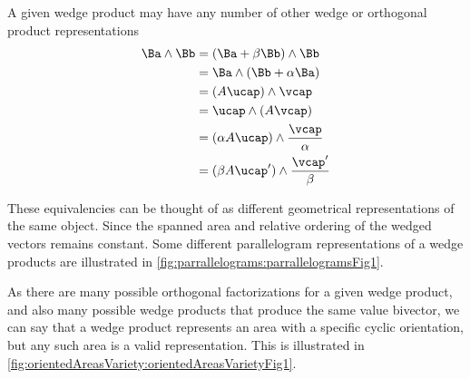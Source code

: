 A given wedge product may have any number of other wedge or orthogonal product representations
\begin{equation}\label{eqn:wedgeProductArea:1940}
\begin{aligned}
\Ba \wedge \Bb
&= (\Ba + \beta \Bb ) \wedge \Bb \\
&= \Ba \wedge ( \Bb + \alpha \Ba ) \\
&= (A \ucap) \wedge \vcap \\
&= \ucap \wedge (A \vcap) \\
&= (\alpha A \ucap) \wedge \frac{\vcap}{\alpha} \\
&= (\beta A \ucap') \wedge \frac{\vcap'}{\beta} \\
\end{aligned}
\end{equation}

These equivalencies can be thought of as different geometrical representations of the same object. Since the spanned area and relative ordering of the wedged vectors remains constant.
Some different parallelogram representations of a wedge products are illustrated in \cref{fig:parrallelograms:parrallelogramsFig1}.


As there are many possible orthogonal factorizations for a given wedge product, and also many possible wedge products that produce the same value bivector,
we can say that a wedge product represents an area with a specific cyclic orientation, but any such area is a valid representation.
This is illustrated in \cref{fig:orientedAreasVariety:orientedAreasVarietyFig1}.



